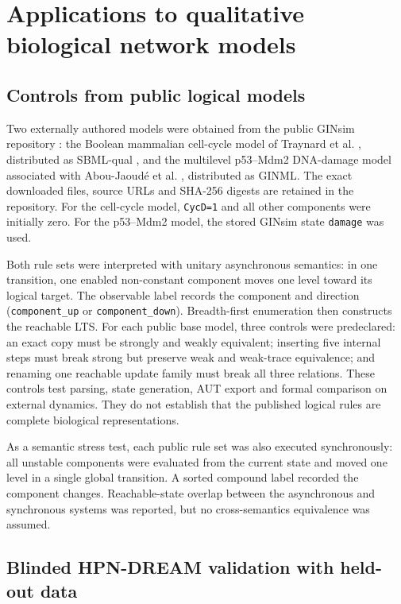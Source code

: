 \documentclass[JMCS,submit]{resources/ISRP}
\theoremstyle{definition}
\theoremstyle{remark}
\numberwithin{equation}{section}
\begin{document}
\section{Applications to qualitative biological network models}
\label{sec:applications}

\subsection{Controls from public logical models}\label{sec:public-method}

Two externally authored models were obtained from the public GINsim repository
\cite{Naldi2018}: the Boolean mammalian cell-cycle model of Traynard et al.
\cite{Traynard2016}, distributed as SBML-qual \cite{Chaouiya2013SBML}, and the
multilevel p53--Mdm2 DNA-damage model associated with Abou-Jaoud\'e et al.
\cite{AbouJaoude2009}, distributed as GINML. The exact downloaded files, source
URLs and SHA-256 digests are retained in the repository. For the cell-cycle
model, \texttt{CycD=1} and all other components were initially zero. For the
p53--Mdm2 model, the stored GINsim state \texttt{damage} was used.

Both rule sets were interpreted with unitary asynchronous semantics: in one
transition, one enabled non-constant component moves one level toward its
logical target. The observable label records the component and direction
(\texttt{component\_up} or \texttt{component\_down}). Breadth-first enumeration
then constructs the reachable LTS. For each public base model, three controls
were predeclared: an exact copy must be strongly and weakly equivalent; inserting
five internal steps must break strong but preserve weak and weak-trace
equivalence; and renaming one reachable update family must break all three
relations. These controls test parsing, state generation, AUT export and formal
comparison on external dynamics. They do not establish that the published
logical rules are complete biological representations.

As a semantic stress test, each public rule set was also executed synchronously:
all unstable components were evaluated from the current state and moved one
level in a single global transition. A sorted compound label recorded the
component changes. Reachable-state overlap between the asynchronous and
synchronous systems was reported, but no cross-semantics equivalence was
assumed.

\subsection{Blinded HPN-DREAM validation with held-out data}
\label{sec:hpn-method}
\end{document}
